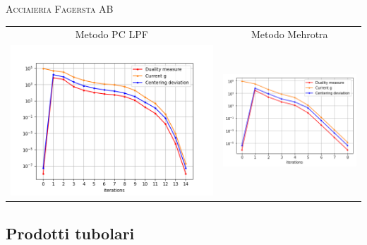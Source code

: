 \begin{frame}{\textsc{\LARGE \textcolor{iris}{Acciaieria Fagersta AB}}}
	\centering
	\begin{tabular}{c@{}c}
		\small{Metodo PC LPF} & \small{Metodo Mehrotra} \\
		\includegraphics[scale = 0.33]{swe_PCLPF}
		&\includegraphics[scale = 0.33]{swe_MER}\\ 
	\end{tabular}
\end{frame}

\subsection{Prodotti tubolari}



